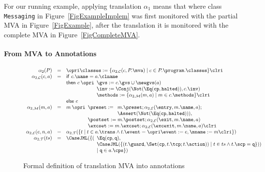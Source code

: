 For our running example, applying translation \(\alpha_1\) means that
where class \texttt{Messaging} in Figure~\ref{FigExampleImplem} was
first monitored with the partial MVA in Figure~\ref{FigExample}, after
the translation it is monitored with the complete MVA in
Figure~\ref{FigCompleteMVA}.

\paragraph{From MVA to Annotations}

\begin{figure}[t]
\[
\begin{array}{rcl}
\alpha_2(P) & = &\opri \classes :=
\{\alpha_{2, \mathcal{C}}(c, P.\mva) \mid c \in P.\program.\classes\} \clri\\

\alpha_{2,\mathcal{C}}(c, a) & = &
\mathsf{if\ }c.\name = a.\clname\\
&&
\mathsf{then\ }c \:\opri
 \begin{array}[t]{l}
 \gvs := c.\gvs \cup \newgvs(a)\\
 \inv := \Conj(\Not(\Eq(\texttt{cp}, \texttt{halted})), c.\inv)\\
 \methods := \{\alpha_{2,\mathcal{M}}(m, a) \mid m \in c.\methods\} \clri
\end{array}\\
&& \mathsf{else\ }c\\
\alpha_{2,\mathcal{M}}(m, a) & = & m \: \opri
  \begin{array}[t]{l}
  \preset := \begin{array}[t]{l}
             m.\preset; \alpha_{2,\mathcal{E}}(\entry, m.\name, a);\\
             \Assert(\Not(\Eq(\texttt{cp}, \texttt{halted}))),
             \end{array}\\
  \postset := m.\postset; \alpha_{2, \mathcal{E}}(\exit, m.\name, a)\\
  \excset := m.\excset; \alpha_{2, \mathcal{E}}(\excexit, m.\name, a)
  \clri
  \end{array}\\
\alpha_{2, \mathcal{E}}(e, n, a) & = &
  \alpha_{2, \mathcal{T}}(\{t \mid t \in a.\trans \wedge
                                   t.\event = \opri \event := e,
                                                    \mname := m \clri
                           \})\\
\alpha_{2, \mathcal{T}}(ts) & = &
  \CaseJML(
    \{(\begin{array}[t]{l}
       \Eq(\texttt{cp}, \texttt{q}),\\
       \CaseJML(\{(t.\guard, \Set(\texttt{cp}, t.\tcp; t.\action)) \mid
                  t \in ts \wedge t.\scp = \texttt{q}
               \}))\\
    \mid \texttt{q} \in a.\cps
    \})
    \end{array}
\end{array}
\]
\caption{Formal definition of translation MVA into annotations}
\label{FigMVAtoAnnot}
\end{figure}


